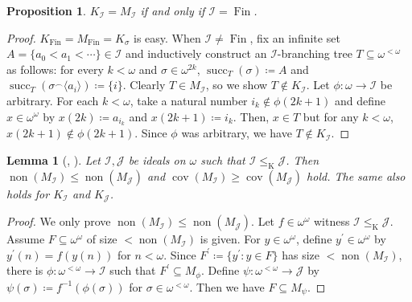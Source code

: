 \documentclass[a4paper,12pt]{amsart}
\newtheorem{prop}[thm]{Proposition}
\newtheorem{lem}[thm]{Lemma}
\theoremstyle{definition}
\numberwithin{thm}{section}
\numberwithin{equation}{section}
\newcommand{\oo}{{\omega}^\omega}
\newcommand{\fsq}{\omega^{<\omega}}
\DeclareMathOperator{\non}{non}
\DeclareMathOperator{\cov}{cov}
\newcommand{\I}{\mathscr{I}}
\newcommand{\J}{\mathscr{J}}
\DeclareMathOperator{\Fin}{Fin}
\DeclareMathOperator{\suc}{succ}
\renewcommand{\subset}{\subseteq}
\begin{document}
    \begin{prop}
        $K_\I = M_\I$ if and only if $\I=\Fin$.
    \end{prop}
    \begin{proof}
        $K_{\Fin}=M_{\Fin}=K_\sigma$ is easy.
        When $\I\neq\Fin$, fix an infinite set $A=\{a_0<a_1<\cdots\}\in\I$ and inductively construct an $\I$-branching tree $T\subseteq\fsq$ as follows: for every $k<\omega$ and $\sigma\in\omega^{2k}$, $\suc_{T}(\sigma)\coloneqq A$ and $\suc_{T}(\sigma^\frown\langle a_i\rangle)\coloneqq\{i\}$. Clearly $T\in M_\I$, so we show $T\notin K_\I$. Let $\phi\colon\omega\to\I$ be arbitrary. For each $k<\omega$, take a natural number $i_k\notin\phi(2k+1)$ and define $x\in\oo$ by $x(2k)\coloneqq a_{i_k}$ and $x(2k+1)\coloneqq i_k$. Then, $x\in T$ but for any $k<\omega$, $x(2k+1)\notin \phi(2k+1)$. Since $\phi$ was arbitrary, we have $T\notin K_\I$.
    \end{proof}

    \begin{lem}[{\cite[Proposition 4.16]{CM25}, \cite[Lemma 4.3]{CGMRS24}}]\label{lem:Katetov_non}
        Let $\I,\J$ be ideals on $\omega$ such that $\I\leq_{\mathrm{K}}\J$. Then $\non(M_\I)\leq\non(M_\J)$ and $\cov(M_\I)\geq\cov(M_\J)$ hold. The same also holds for $K_\I$ and $K_\J$.
    \end{lem}
    \begin{proof}
        We only prove $\non(M_\I)\leq\non(M_\J)$.
    	Let $f\in\oo$ witness $\I\leq_{\mathrm{K}} \J$.
        Assume $F\subset\oo$ of size $<\non(M_\I)$ is given.
    	For $y\in \oo$, define $y^\prime\in\oo$ by $y^\prime(n)=f(y(n))$ for $n<\omega$.
        Since $F^\prime\coloneqq\{y^\prime:y\in F\}$ has size $<\non(M_\I)$,
        there is $\phi\colon\fsq\to\I$ such that $F^\prime\subset M_\phi$.
        Define $\psi\colon\fsq\to\J$ by $\psi(\sigma)\coloneqq f^{-1}(\phi(\sigma))$ for $\sigma\in\fsq$. Then we have $F\subset M_\psi$.
    \end{proof}
    
\end{document}
